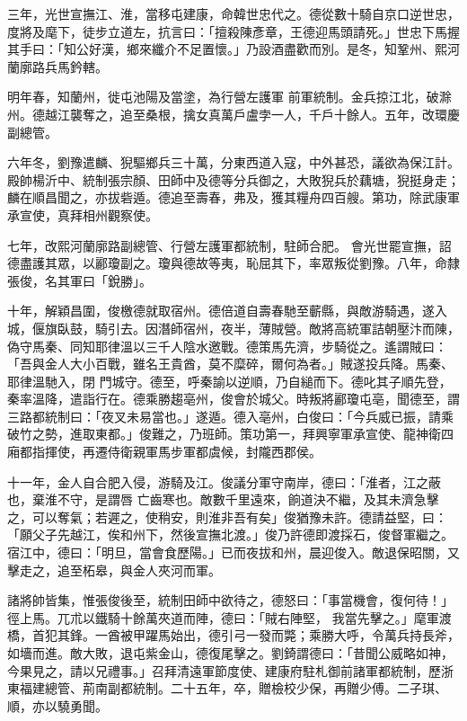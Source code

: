 \begin{pinyinscope}
 三年，光世宣撫江、淮，當移屯建康，命韓世忠代之。德從數十騎自京口逆世忠，度將及麾下，徒步立道左，抗言曰：「擅殺陳彥章，王德迎馬頭請死。」世忠下馬握其手曰：「知公好漢，鄉來纖介不足置懷。」乃設酒盡歡而別。是冬，知鞏州、熙河蘭廓路兵馬鈐轄。



 明年春，知蘭州，徙屯池陽及當塗，為行營左護軍
 前軍統制。金兵掠江北，破滁州。德越江襲奪之，追至桑根，擒女真萬戶盧孛一人，千戶十餘人。五年，改環慶副總管。



 六年冬，劉豫遣麟、猊驅鄉兵三十萬，分東西道入寇，中外甚恐，議欲為保江計。殿帥楊沂中、統制張宗顏、田師中及德等分兵御之，大敗猊兵於藕塘，猊挺身走；麟在順昌聞之，亦拔砦遁。德追至壽春，弗及，獲其糧舟四百艘。第功，除武康軍承宣使，真拜相州觀察使。



 七年，改熙河蘭廓路副總管、行營左護軍都統制，駐師合肥。
 會光世罷宣撫，詔德盡護其眾，以酈瓊副之。瓊與德故等夷，恥屈其下，率眾叛從劉豫。八年，命隸張俊，名其軍曰「銳勝」。



 十年，解穎昌圍，俊檄德就取宿州。德倍道自壽春馳至蘄縣，與敵游騎遇，遂入城，偃旗臥鼓，騎引去。因潛師宿州，夜半，薄賊營。敵將高統軍詰朝壓汴而陳，偽守馬秦、同知耶律溫以三千人陰水邀戰。德策馬先濟，步騎從之。遙謂賊曰：「吾與金人大小百戰，雖名王貴酋，莫不糜碎，爾何為者。」賊遂投兵降。馬秦、耶律溫馳入，閉
 門城守。德至，呼秦諭以逆順，乃自縋而下。德叱其子順先登，秦率溫降，遣詣行在。德乘勝趨亳州，俊會於城父。時叛將酈瓊屯亳，聞德至，謂三路都統制曰：「夜叉未易當也。」遂遁。德入亳州，白俊曰：「今兵威已振，請乘破竹之勢，進取東都。」俊難之，乃班師。策功第一，拜興寧軍承宣使、龍神衛四廂都指揮使，再遷侍衛親軍馬步軍都虞候，封隴西郡侯。



 十一年，金人自合肥入侵，游騎及江。俊議分軍守南岸，德曰：「淮者，江之蔽也，棄淮不守，是謂唇
 亡齒寒也。敵數千里遠來，餉道決不繼，及其未濟急擊之，可以奪氣；若遲之，使稍安，則淮非吾有矣」俊猶豫未許。德請益堅，曰：「願父子先越江，俟和州下，然後宣撫北渡。」俊乃許德即渡採石，俊督軍繼之。宿江中，德曰：「明旦，當會食歷陽。」已而夜拔和州，晨迎俊入。敵退保昭關，又擊走之，追至柘皋，與金人夾河而軍。



 諸將帥皆集，惟張俊後至，統制田師中欲待之，德怒曰：「事當機會，復何待！」徑上馬。兀朮以鐵騎十餘萬夾道而陣，德曰：「賊右陣堅，
 我當先擊之。」麾軍渡橋，首犯其鋒。一酋被甲躍馬始出，德引弓一發而斃；乘勝大呼，令萬兵持長斧，如墻而進。敵大敗，退屯紫金山，德復尾擊之。劉錡謂德曰：「昔聞公威略如神，今果見之，請以兄禮事。」召拜清遠軍節度使、建康府駐札御前諸軍都統制，歷浙東福建總管、荊南副都統制。二十五年，卒，贈檢校少保，再贈少傅。二子琪、順，亦以驍勇聞。




\end{pinyinscope}
